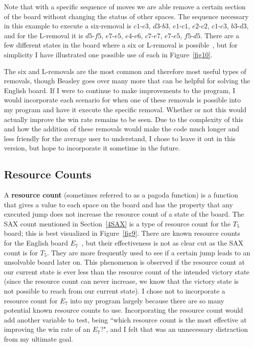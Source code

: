 \documentclass{article}
\begin{document}
Note that with a specific sequence of moves we are able remove a certain section of the board without changing the status of other spaces. The sequence necessary in this example to execute a six-removal is $c1$-$c3$, $d3$-$b3$, $e1$-$c1$, $e2$-$c2$, $c1$-$c3$, $b3$-$d3$, and for the L-removal it is $d5$-$f5$, $e7$-$e5$, $e4$-$e6$, $c7$-$e7$, $e7$-$e5$, $f5$-$d5$. There are a few different states in the board where a six or L-removal is possible~\cite{Beasley}, but for simplicity I have illustrated one possible use of each in Figure~\ref{fig10}.

The six and L-removals are the most common and therefore most useful types of removals, though Beasley goes over many more that can be helpful for solving the English board. If I were to continue to make improvements to the program, I would incorporate each scenario for when one of these removals is possible into my program and have it execute the specific removal. Whether or not this would actually improve the win rate remains to be seen. Due to the complexity of this and how the addition of these removals would make the code much longer and less friendly for the average user to understand, I chose to leave it out in this version, but hope to incorporate it sometime in the future.

\subsection{Resource Counts}
A \textbf{resource count} (sometimes referred to as a pagoda function) is a function that gives a value to each space on the board and has the property that any executed jump does not increase the resource count of a state of the board. The SAX count mentioned in Section~\ref{4SAX} is a type of resource count for the $T_5$ board; this is best visualized in Figure~\ref{fig9}. There are known resource counts for the English board $E_7$~\cite{Beasley}, but their effectiveness is not as clear cut as the SAX count is for $T_5$. They are more frequently used to see if a certain jump leads to an unsolvable board later on. This phenomenon is observed if the resource count at our current state is ever less than the resource count of the intended victory state (since the resource count can never increase, we know that the victory state is not possible to reach from our current state). I chose not to incorporate a resource count for $E_7$ into my program largely because there are so many potential known resource counts to use. Incorporating the resource count would add another variable to test, being ``which resource count is the most effective at improving the win rate of an $E_7$?", and I felt that was an unnecessary distraction from my ultimate goal.
\end{document}
